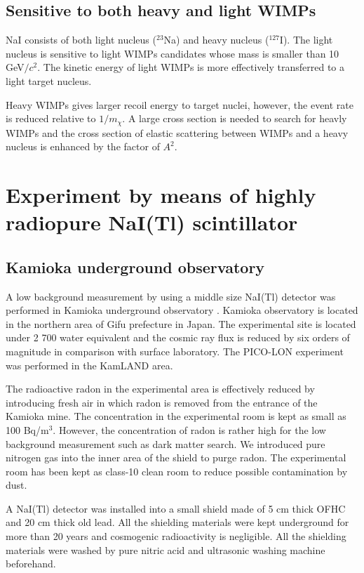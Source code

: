 \documentclass{jpsj-suppl} %
\begin{document}
\subsection{Sensitive to both heavy and light WIMPs}
NaI consists of both light nucleus ($^{23}$Na) and heavy nucleus ($^{127}$I).
The light nucleus is sensitive to light WIMPs candidates whose mass is smaller than 10 GeV$/c^{2}$.
The kinetic energy of light WIMPs is more effectively transferred to a light target nucleus.

Heavy WIMPs gives larger recoil energy to target nuclei, however, 
the event rate is reduced relative to $1/m_{\chi}$.
A large cross section is needed to search for heavly WIMPs and
the cross section of elastic scattering between WIMPs and a heavy nucleus is 
enhanced by the factor of $A^{2}$.


\section{Experiment by means of highly radiopure NaI(Tl) scintillator}
\subsection{Kamioka underground observatory}
A low background measurement by using a middle size NaI(Tl) detector was performed in 
Kamioka underground observatory \cite{Takemoto}.
Kamioka observatory is located in the northern area of Gifu prefecture in Japan.
The experimental site is located under 2 700 water equivalent and the cosmic ray flux
is reduced by six orders of magnitude in comparison with surface laboratory.
The PICO-LON experiment was performed in the KamLAND area.

The radioactive radon in the experimental area is effectively reduced by introducing 
fresh air in which radon is removed from the entrance of the Kamioka mine.
The concentration in the experimental room is kept as small as 100 Bq/m$^{3}$.
However, the concentration of radon is rather high for the low background 
measurement such as dark matter search.
We introduced pure nitrogen gas into the inner area of the shield to purge radon.
The experimental room has been kept as class-10 clean room to reduce possible contamination 
by dust.

A NaI(Tl) detector was installed into a small shield made of 5 cm thick 
OFHC and 20 cm thick old lead.
All the shielding materials were kept underground for more than 20 years and 
cosmogenic radioactivity is negligible.
All the shielding materials were washed by pure nitric acid and ultrasonic washing machine
beforehand.
\end{document}
